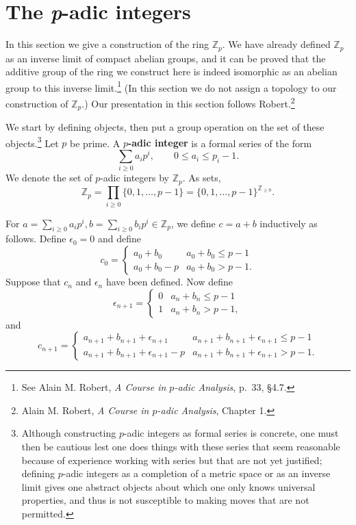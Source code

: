\documentclass{article}
\theoremstyle{definition}
\theoremstyle{definition}
\begin{document}
\section{The {\em p}-adic integers}
In this section we give a construction of the  ring $\mathbb{Z}_p$. We have already defined
$\mathbb{Z}_p$ as an inverse limit of compact abelian groups, and it can be proved that
the additive group of the 
ring we construct here is indeed isomorphic as an abelian group  to this inverse limit.\footnote{See Alain M. Robert, {\em A Course in $p$-adic Analysis},
p.~33, \S 4.7.}
(In this section we do not  assign a topology to our construction of $\mathbb{Z}_p$.)
Our presentation in this section follows Robert.\footnote{Alain M. Robert, {\em A Course in $p$-adic Analysis},
Chapter 1.}

We start by defining objects, then put a group operation on the set of these objects.\footnote{Although constructing $p$-adic integers as formal
series is concrete, one must then be cautious lest one does things with these series that seem reasonable because of experience working with series
but that are not yet justified; defining $p$-adic integers as a completion of a metric space or as an inverse limit gives one abstract objects about which
one only knows universal properties, and thus is not susceptible to making moves that are not permitted.}
Let $p$ be prime.
A \textbf{$p$-adic integer} is a formal  series of the form
\[
\sum_{i \geq 0} a_i p^i, \qquad 0 \leq a_i \leq p_i-1.
\]
We denote the set of $p$-adic integers by $\mathbb{Z}_p$. As sets,
\[
\mathbb{Z}_p = \prod_{i \geq 0} \{0,1,\ldots,p-1\} = \{0,1,\ldots,p-1\}^{\mathbb{Z}_{\geq 0}}.
\]

For $a=\sum_{i \geq 0} a_i p^i, b=\sum_{i \geq 0} b_i p^i \in \mathbb{Z}_p$, we define
$c=a+b$ inductively as follows. Define $\epsilon_0=0$ and define
\[
c_0 = \begin{cases}
a_0+b_0&a_0+b_0 \leq p-1\\
a_0+b_0-p&a_0+b_0>p-1.
\end{cases}
\]
Suppose that $c_n$ and $\epsilon_n$ have been defined. Now define
\[
\epsilon_{n+1} = \begin{cases}
0&a_n+b_n \leq p-1\\
1&a_n+b_n>p-1,
\end{cases}
\]
and
\[
c_{n+1} = \begin{cases}
a_{n+1}+b_{n+1}+\epsilon_{n+1}&a_{n+1}+b_{n+1}+\epsilon_{n+1} \leq p-1\\
a_{n+1}+b_{n+1}+\epsilon_{n+1}-p&a_{n+1}+b_{n+1}+\epsilon_{n+1} > p-1.
\end{cases}
\]
\end{document}
